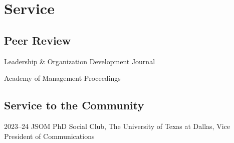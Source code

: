 \documentclass[11pt,letterpaper]{report} %
\newcommand{\listitemspace}{0.25em}
\renewenvironment{itemize}
{\begin{list}{}{\setlength{\leftmargin}{0em}
                \setlength{\parskip}{0em}
                \setlength{\itemsep}{\listitemspace}
                \setlength{\parsep}{\listitemspace}}}
{\end{list}}
\begin{document}
    \section*{Service}


    \subsection*{Peer Review}

    \begin{itemize}

        \item Leadership \& Organization Development Journal
        
        \item Academy of Management Proceedings
        
    \end{itemize}


   \subsection*{Service to the Community}

   \begin{tablist}

       \item[2023--24]    \tab{}JSOM PhD Social Club, The University of Texas at Dallas, Vice President of Communications

   \end{tablist}





\end{document}
